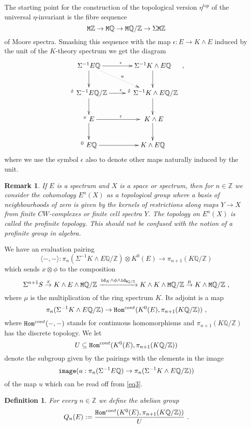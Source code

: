 \documentclass[12pt]{article}
\newtheorem{ddd}[theorem]{Definition}
\newtheorem{rem}[theorem]{Remark}
\newcommand{\id}{{\tt id}}
\newcommand{\Z}{{\mathbb{Z}}}
\newcommand{\Q}{{\mathbb{Q}}}
\newcommand{\tM}{{\tt M}}
\newcommand{\image}{{\tt image}}
\newcommand{\Hom}{{\tt Hom}}
\begin{document}
The starting point for the construction of  the topological version $\eta^{top}$ of the universal $\eta$-invariant  is the fibre sequence
\begin{equation}\label{eq631}\tM\Z\to \tM\Q\to \tM\Q/\Z\to \Sigma \tM\Z\end{equation}
of Moore spectra. Smashing this sequence with the map $\epsilon:E\to K\wedge E$ induced by the unit of the $K$-theory spectrum we get the diagram 
\begin{equation}\label{eq3}\xymatrix{\Sigma^{-1}E\Q \ar@{.>}[dr]^{u}\ar[d]\ar[r]^{\epsilon}& \Sigma^{-1} K\wedge E\Q \ar[d]\\ {}^{\hat x}\ \Sigma^{-1}E\Q/\Z \ar[r]^{\epsilon}\ar[d]&{}^{\tilde x}\   \Sigma^{-1}K\wedge E\Q/\Z \ar[d]\\{}^{x}\ E   \ar[d]\ar[r]^{\epsilon}&\ K\wedge E \ar[d]\\{}^{0}\ E\Q \ar[r]&K\wedge E \Q }\ ,\end{equation}
where we use the symbol $\epsilon$ also to denote other maps naturally induced by the unit.

\begin{rem}\label{proffinite1}{\rm
If $E$ is a spectrum and $X$ is a space or spectrum, then for $n\in \Z$ we consider the cohomology $E^{n}(X)$ as a topological group  where a basis of neighbourhoods of zero is given by the kernels of restrictions along maps $Y\to X$ from finite $CW$-complexes or finite cell spectra $Y$.
The topology on $E^{n}(X)$ is called the profinite topology. This should not be confused   with the notion of a profinite group in algebra. 
}
\end{rem}
 
We have an evaluation pairing 
 \begin{equation}\label{neu15neu}\langle-,-\rangle:\pi_{n}(\Sigma^{-1}K\wedge E\Q/\Z)\otimes K^{0}(E)\to \pi_{n+1}(K\Q/\Z)\end{equation}
which sends $x\otimes \phi$ to the composition
$$\Sigma^{n+1}S\stackrel{x}{\to} K\wedge E\wedge \tM\Q/\Z\xrightarrow{\id_{K}\wedge\phi\wedge \id_{\tM\Q/\Z}}K\wedge K\wedge \tM\Q/\Z \stackrel{\mu}{\to} K\wedge \tM \Q/\Z\ ,$$
where $\mu$  is the multiplication of the ring spectrum $K$.
Its adjoint
is a map
$$\pi_{n}(\Sigma^{-1}K\wedge E\Q/\Z)\to \Hom^{cont}(K^{0}(E), \pi_{n+1}(K\Q/\Z))\ ,$$
where $\Hom^{cont}(-,-)$ stands for continuous homomorphisms and $ \pi_{n+1}(K\Q/\Z)$ has the discrete topology.
We let  
\begin{equation}\label{sec31u}U\subseteq  \Hom^{cont}(K^{0}(E),\pi_{n+1}(K\Q/\Z))\end{equation} denote the subgroup
given by the pairings with the elements in the image
$$\image(u:\pi_{n}(\Sigma^{-1}E\Q)\to \pi_{n}(\Sigma^{-1}K\wedge E\Q/\Z))$$
of the map $u$ which can be read off from \eqref{eq3}.
\begin{ddd}\label{defqq} For every $n\in \Z$
we  define the abelian group
\begin{equation}\label{eq5}
Q_{n}(E):=\frac{ \Hom^{cont}(K^{0}(E),\pi_{n+1}(K\Q/\Z))}{U}\ .\end{equation}
\end{ddd}
\end{document}
